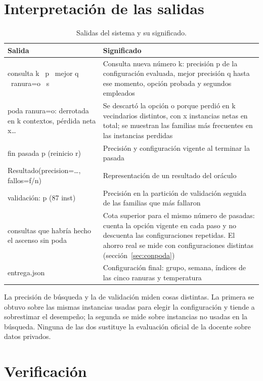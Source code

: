 \documentclass[12pt,letterpaper]{article}
\theoremstyle{definition}
\begin{document}
\section{Interpretación de las salidas}

\begin{table}[H]
\caption{Salidas del sistema y su significado.}
\begin{tabularx}{\textwidth}{@{}p{5.6cm}L@{}}
\toprule
Salida & Significado \\
\midrule
consulta k \ p \ mejor q \ ranura=o \ s & Consulta nueva número k: precisión p de la configuración evaluada, mejor precisión q hasta ese momento, opción probada y segundos empleados \\
poda ranura=o: derrotada en k contextos, pérdida neta x\dots & Se descartó la opción o porque perdió en k vecindarios distintos, con x instancias netas en total; se muestran las familias más frecuentes en las instancias perdidas \\
fin pasada p (reinicio r) & Precisión y configuración vigente al terminar la pasada \\
Resultado(precision=\dots, fallos=f/n) & Representación de un resultado del oráculo \\
validación: p (87 inst) & Precisión en la partición de validación seguida de las familias que más fallaron \\
consultas que habría hecho el ascenso sin poda & Cota superior para el mismo número de pasadas: cuenta la opción vigente en cada paso y no descuenta las configuraciones repetidas. El ahorro real se mide con configuraciones distintas (sección~\ref{sec:conpoda}) \\
entrega.json & Configuración final: grupo, semana, índices de las cinco ranuras y temperatura \\
\bottomrule
\end{tabularx}
\end{table}

La precisión de búsqueda y la de validación miden cosas distintas. La primera se obtuvo sobre las mismas instancias usadas para elegir la configuración y tiende a sobrestimar el desempeño; la segunda se mide sobre instancias no usadas en la búsqueda. Ninguna de las dos sustituye la evaluación oficial de la docente sobre datos privados.

\section{Verificación}
\end{document}

